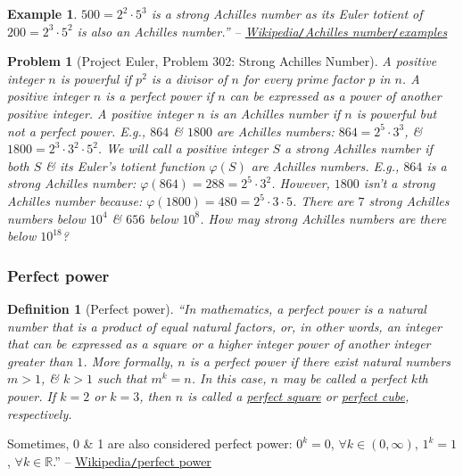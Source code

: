 \documentclass{article}
\newtheorem{definition}{Definition}
\newtheorem{example}{Example}
\newtheorem{problem}{Problem}
\begin{document}
\begin{example}
	$500 = 2^2\cdot5^3$ is a strong Achilles number as its Euler totient of $200 = 2^3\cdot5^2$ is also an Achilles number.'' -- \href{https://en.wikipedia.org/wiki/Achilles_number#Examples}{Wikipedia\emph{{\tt /}}Achilles number\emph{{\tt /}}examples}
\end{example}

\begin{problem}[Project Euler, Problem 302: Strong Achilles Number]
	A positive integer $n$ is \emph{powerful} if $p^2$ is a divisor of $n$ for every prime factor $p$ in $n$. A positive integer $n$ is a \emph{perfect power} if $n$ can be expressed as a power of another positive integer. A positive integer $n$ is an \emph{Achilles number} if $n$ is powerful but not a perfect power. E.g., $864$ \& $1800$ are Achilles numbers: $864 = 2^5\cdot3^3$, \& $1800 = 2^3\cdot3^2\cdot5^2$. We will call a positive integer $S$ a \emph{strong Achilles number} if both $S$ \& its Euler's totient function $\varphi(S)$ are Achilles numbers. E.g., $864$ is a strong Achilles number: $\varphi(864) = 288 = 2^5\cdot3^2$. However, $1800$ isn't a strong Achilles number because: $\varphi(1800) = 480 = 2^5\cdot3\cdot5$. There are $7$ strong Achilles numbers below $10^4$ \& $656$ below $10^8$. How may strong Achilles numbers are there below $10^{18}$?
\end{problem}

\subsubsection{Perfect power}

\begin{definition}[Perfect power]
	``In mathematics, a \emph{perfect power} is a natural number that is a product of equal natural factors, or, in other words, an integer that can be expressed as a square or a higher integer power of another integer greater than $1$. More formally, $n$ is a \emph{perfect power} if there exist natural numbers $m > 1$, \& $k > 1$ such that $m^k = n$. In this case, $n$ may be called a \emph{perfect $k$th power}. If $k = 2$ or $k = 3$, then $n$ is called a \href{https://en.wikipedia.org/wiki/Square_number}{perfect square} or \href{https://en.wikipedia.org/wiki/Perfect_cube}{perfect cube}, respectively.
\end{definition}
Sometimes, 0 \& 1 are also considered perfect power: $0^k = 0$, $\forall k\in(0,\infty)$, $1^k = 1$, $\forall k\in\mathbb{R}$.'' -- \href{https://en.wikipedia.org/wiki/Perfect_power}{Wikipedia{\tt /}perfect power}
\end{document}
